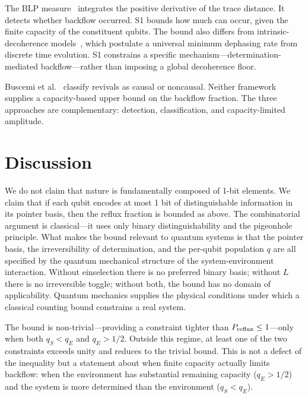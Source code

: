 \documentclass[aps,prl,twocolumn,superscriptaddress,hyperref]{revtex4-2}
\begin{document}
The BLP measure~\cite{Breuer:2009, Breuer:2016} integrates the positive derivative of the trace distance. It detects whether backflow occurred. S1 bounds how much can occur, given the finite capacity of the constituent qubits. The bound also differs from intrinsic-decoherence models~\cite{Milburn:1991}, which postulate a universal minimum dephasing rate from discrete time evolution. S1 constrains a specific mechanism---determination-mediated backflow---rather than imposing a global decoherence floor.

Buscemi et al.~\cite{Buscemi:2025} classify revivals as causal or noncausal. Neither framework supplies a capacity-based upper bound on the backflow fraction. The three approaches are complementary: detection, classification, and capacity-limited amplitude.

\section{Discussion}

We do not claim that nature is fundamentally composed of 1-bit elements. We claim that if each qubit encodes at most 1 bit of distinguishable information in its pointer basis, then the reflux fraction is bounded as above. The combinatorial argument is classical---it uses only binary distinguishability and the pigeonhole principle. What makes the bound relevant to quantum systems is that the pointer basis, the irreversibility of determination, and the per-qubit population $q$ are all specified by the quantum mechanical structure of the system-environment interaction. Without einselection there is no preferred binary basis; without $L$ there is no irreversible toggle; without both, the bound has no domain of applicability. Quantum mechanics supplies the physical conditions under which a classical counting bound constrains a real system.

The bound is non-trivial---providing a constraint tighter than $P_{\rm reflux} \leq 1$---only when both $q_S < q_E$ and $q_E > 1/2$. Outside this regime, at least one of the two constraints exceeds unity and reduces to the trivial bound. This is not a defect of the inequality but a statement about when finite capacity actually limits backflow: when the environment has substantial remaining capacity ($q_E > 1/2$) and the system is more determined than the environment ($q_S < q_E$).
\end{document}
